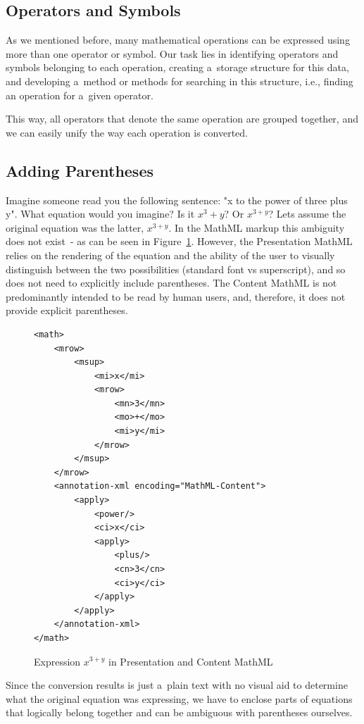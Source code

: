 \documentclass[11pt,oneside,final]{fithesis2}
\begin{document}
\subsection{Operators and Symbols}
As we mentioned before, many mathematical operations can be expressed using more than one operator or symbol. Our task lies in identifying operators and symbols belonging to each operation, creating a~storage structure for this data, and developing a~method or methods for searching in this structure, i.e., finding an operation for a~given operator. 

This way, all operators that denote the same operation are grouped together, and we can easily unify the way each operation is converted.

\subsection{Adding Parentheses}
Imagine someone read you the following sentence: "x to the power of three plus y". What equation would you imagine? Is it $x^{3} + y$? Or $x^{3+y}$? Lets assume the original equation was the latter, $x^{3+y}$. In the MathML markup this ambiguity does not exist~- as can be seen in Figure~\ref{fig:addingbraces}. However, the Presentation MathML relies on the rendering of the equation and the ability of the user to visually distinguish between the two possibilities (standard font vs superscript), and so does not need to explicitly include parentheses. The Content MathML is not predominantly intended to be read by human users, and, therefore, it does not provide explicit parentheses.

\begin{figure}[!ht]
\lstset{language=XML,frame=lines}
\begin{lstlisting}
<math>
	<mrow>
		<msup>
			<mi>x</mi>
			<mrow>
				<mn>3</mn>
				<mo>+</mo>
				<mi>y</mi>
			</mrow>
		</msup>
	</mrow>
	<annotation-xml encoding="MathML-Content">
		<apply>
			<power/>
			<ci>x</ci>
			<apply>
				<plus/>
				<cn>3</cn>
				<ci>y</ci>
			</apply>
		</apply>
	</annotation-xml>
</math>
\end{lstlisting}
\caption{Expression $x^{3+y}$ in Presentation and Content MathML}
\label{fig:addingbraces}
\end{figure}

Since the conversion results is just a~plain text with no visual aid to determine what the original equation was expressing, we have to enclose parts of equations that logically belong together and can be ambiguous with parentheses ourselves. 
\end{document}
